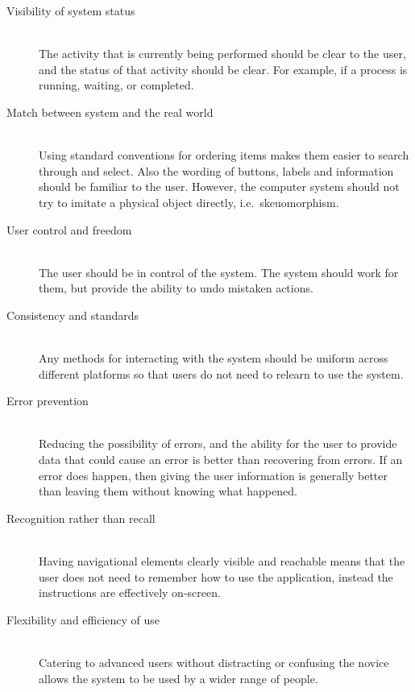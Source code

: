 \begin{description}

	\item[Visibility of system status]\hfill \\ The activity that is currently
		being performed should be clear to the user, and the status of that
		activity should be clear. For example, if a process is running,
		waiting, or completed.

	\item[Match between system and the real world]\hfill \\ Using standard
		conventions for ordering items makes them easier to search through and
		select. Also the wording of buttons, labels and information should be
		familiar to the user. However, the computer system should not try to
		imitate a physical object directly, i.e.\ skeuomorphism.

	\item[User control and freedom]\hfill \\ The user should be in control of
		the system. The system should work for them, but provide the ability to
		undo mistaken actions.

	\item[Consistency and standards]\hfill \\ Any methods for interacting with
		the system should be uniform across different platforms so that users
		do not need to relearn to use the system.

	\item[Error prevention]\hfill \\ Reducing the possibility of errors, and
		the ability for the user to provide data that could cause an error is
		better than recovering from errors. If an error does happen, then
		giving the user information is generally better than leaving them
		without knowing what happened.

	\item[Recognition rather than recall]\hfill \\ Having navigational elements
		clearly visible and reachable means that the user does not need to
		remember how to use the application, instead the instructions are
		effectively on-screen.

	\item[Flexibility and efficiency of use]\hfill \\ Catering to advanced
		users without distracting or confusing the novice allows the system to
		be used by a wider range of people.


\end{description}
